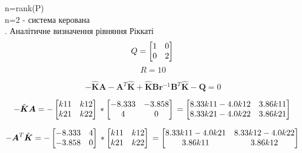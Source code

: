 \documentclass[a4paper]{article}
\begin{document}
\hfill \break
\indent \indent n=rank(P)\\
\hfill \break
\indent \indent n=2 - система керована\\

\hfill \break
{}. Аналітичне визначення рівняння Ріккаті\\

\[
Q =
\begin{bmatrix}
    1 & 0 \\
    0 & 2 \\
\end{bmatrix}\\
\]
\[
R = 10
\]

\[
-\hat{\boldsymbol{K}}\boldsymbol{A} - \boldsymbol{A}^T\hat{\boldsymbol{K}} + \hat{\boldsymbol{K}}\boldsymbol{B}\boldsymbol{r}^{-1}\boldsymbol{B}^T\hat{\boldsymbol{K}}-\boldsymbol{Q} = 0
\]

\[
-\hat{\boldsymbol{K}}\boldsymbol{A} =
-\begin{bmatrix}
    k11 & k12 \\
    k21 & k22 \\
\end{bmatrix}\\ *
\begin{bmatrix}
    -8.333 & -3.858 \\
    4 & 0 \\
\end{bmatrix}\\ = 
\begin{bmatrix}
    8.33k11 - 4.0k12 & 3.86k11 \\
    8.33k21 - 4.0k22 & 3.86k21 \\
\end{bmatrix}\\
\]

\[
-\boldsymbol{A}^T\hat{\boldsymbol{K}} =
-\begin{bmatrix}
    -8.333 & 4 \\
    -3.858 & 0 \\
\end{bmatrix}\\ *
\begin{bmatrix}
    k11 & k12 \\
    k21 & k22 \\
\end{bmatrix}\\ = 
\begin{bmatrix}
    8.33k11 - 4.0k21 & 8.33k12 - 4.0k22 \\
    3.86k11 & 3.86k12 \\
\end{bmatrix}\\
\]
\end{document}
